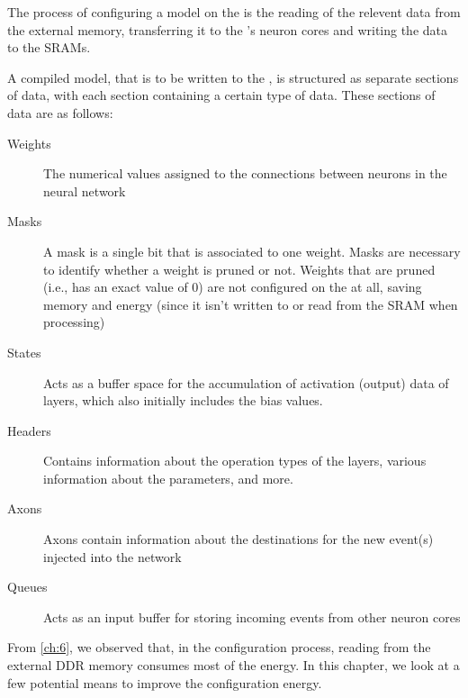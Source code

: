 The process of configuring a model on the \graicore{} is the reading of the relevent data from the external memory, transferring it to the \graicore{}'s neuron cores and writing the data to the SRAMs.

A compiled model, that is to be written to the \graicore{}, is structured as separate sections of data, with each section containing a certain type of data.
These sections of data are as follows:
\begin{description}
    \item[Weights] 
    The numerical values assigned to the connections between neurons in the neural network
    \item[Masks] 
    A mask is a single bit that is associated to one weight.
    Masks are necessary to identify whether a weight is pruned or not.
    Weights that are pruned (i.e., has an exact value of $0$) are not configured on the \graicore{} at all, saving memory and energy (since it isn't written to or read from the SRAM when processing)
    \item[States] 
    Acts as a buffer space for the accumulation of activation (output) data of layers, which also initially includes the bias values.
    \item[Headers] 
    Contains information about the operation types of the layers, various information about the parameters, and more.
    \item[Axons] 
    Axons contain information about the destinations for the new event(s) injected into the network
    \item[Queues] 
    Acts as an input buffer for storing incoming events from other neuron cores 
\end{description}

From \cref{ch:6}, we observed that, in the configuration process, reading from the external DDR memory consumes most of the energy.
In this chapter, we look at a few potential means to improve the configuration energy.

